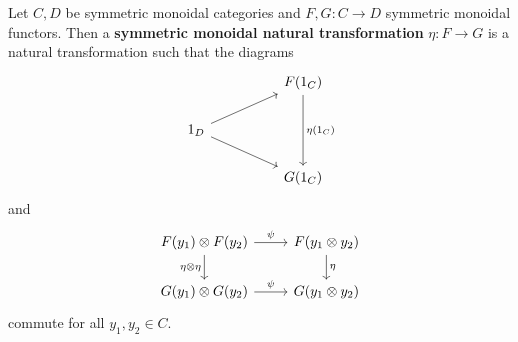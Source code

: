 \begin{definition}[]
    Let $C,D$ be symmetric monoidal categories and $F, G \colon C \to D$ symmetric monoidal functors. Then a \textbf{symmetric monoidal natural transformation} $\eta \colon F \to G$ is a natural transformation such that the diagrams \[
    \begin{tikzcd}
                            &  & F(1_C) \arrow[dd, "\eta(1_C)"] \\
1_D \arrow[rru] \arrow[rrd] &  &                                \\
                            &  & G(1_C)                        
\end{tikzcd}
    \]  and \[
   \begin{tikzcd}
F(y_1)\otimes F(y_2) \arrow[r, "\psi"] \arrow[d, "\eta \otimes \eta"'] & F(y_1\otimes y_2) \arrow[d, "\eta"] \\
G(y_1)\otimes G(y_2) \arrow[r, "\psi"]                                 & G(y_1\otimes y_2)                  
\end{tikzcd} 
    \] commute for all $y_1,y_2 \in C$.
\end{definition}

